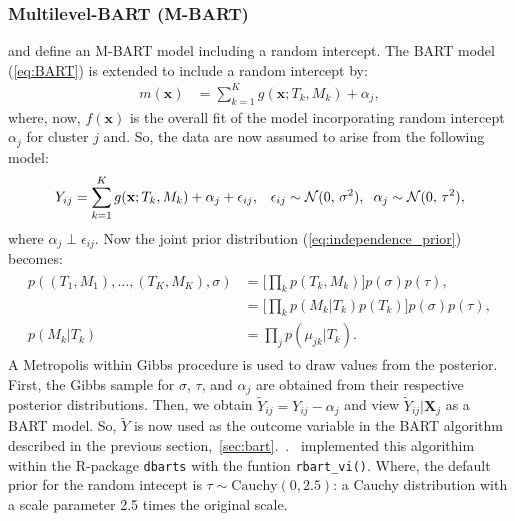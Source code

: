 \documentclass[10pt, a4paper, titlepage]{article}
\begin{document}
\subsubsection{Multilevel-BART (M-BART)}
\citet{wagner2020,tan2016} and \citet{dorie2024} define an M-BART model including a random intercept. The BART model (\ref{eq:BART}) is extended to include a random intercept by: 
\begin{align} 
    \label{eq:M-BART}
    m(\textbf{x}) &= \sum^{K}_{k=1}g(\textbf{x}; T_{k}, M_{k}) + \alpha_{j}, 
\end{align} where, now, $f(\textbf{x})$ is the overall fit of the model incorporating random intercept $\alpha_{j}$ for cluster $j$ and. So, the data are now assumed to arise from the following model: 
\begin{align}
    \label{eq:M-BART_model}
    Y_{ij} = \sum^{K}_{k=1}g(\textbf{x}; T_{k}, M_{k}) + \alpha_j + \epsilon_{ij}, & &\epsilon_{ij} \sim \mathcal{N}(0,\,\sigma^{2}), \hspace{.2cm} \alpha_{j} \sim \mathcal{N}(0,\,\tau^{2}),
\end{align} where $\alpha_j \perp \epsilon_{ij}$. Now the joint prior distribution (\ref{eq:independence_prior}) becomes: 
\begin{align}
\begin{split}
    \label{eq:indepdence_prior_mbart}
    p((T_1, M_1), \dots, (T_K, M_K), \sigma) &= \Big[\prod_{k}p(T_k, M_k)\Big]p(\sigma)p(\tau), \\
    &= \Big[\prod_{k}p(M_k|T_k)p(T_k)\Big]p(\sigma)p(\tau), \\
    p(M_k|T_k) &= \prod_{j}p(\mu_{jk}|T_k).
\end{split}
\end{align} 
A Metropolis within Gibbs procedure is used to draw values from the posterior. First, the Gibbs sample for $\sigma$, $\tau$, and $\alpha_j$ are obtained from their respective posterior distributions. Then, we obtain $\tilde{Y}_{ij} = Y_{ij} - \alpha_{j}$ and view $\tilde{Y}_{ij}| \boldsymbol{X}_{j}$ as a BART model. So, $\tilde{Y}$ is now used as the outcome variable in the BART algorithm described in the previous section,~\ref{sec:bart}.~\citep{wagner2020,tan2016}.~\citet{dorie2024} implemented this algorithim within the R-package \texttt{dbarts} with the funtion \texttt{rbart\_vi()}. Where, the default prior for the random intecept is $\tau \sim \text{Cauchy}(0, 2.5)$: a Cauchy distribution with a scale parameter 2.5 times the original scale.
\end{document}
